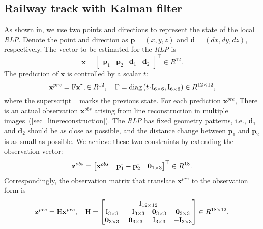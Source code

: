\subsection{Railway track with Kalman filter}
As shown in, 
we use two points and directions to represent the state of the local \textit{RLP}.
Denote the point and direction as
$\mathbf p=\left(x,y,z\right)$ and $\mathbf d=\left(dx,dy,dz\right)$,
respectively.
The vector to be estimated for the \textit{RLP} is
\begin{equation}
\mathbf x = \begin{bmatrix}
    \mathbf p_1 & \mathbf p_2 & \mathbf d_1  & \mathbf d_2 
\end{bmatrix}^ \top \in R^{12}.
\end{equation}
The prediction of $\mathbf x$ is controlled by a scalar $t$:
\begin{equation}
        \mathbf{x}^{pre}= 
        \mathrm F \mathbf x^{{\mbox -}}, \in R^{12}, \quad  
        \mathrm F=\operatorname{diag}\left(t \! \cdot \! \mathrm I_{6\times6} , \mathrm I_{6\times6}\right) \in R^{12\times 12},
        \label {eq_statetransition}
\end{equation}
where the superscript $^{\mbox -}$ marks the previous state.
For each prediction $\mathbf{x}^{pre}$,
There is an actual observation $\mathbf{x}^{obs}$ arising from line reconstruction in multiple images~(\cref*{sec_linereconstruction}).
The \textit{RLP} has fixed geometry patterns,
i.e.,
$\mathbf d_1$ and $\mathbf d_2$ should be as close as possible,
and the distance change between $\mathbf p_1$ and $\mathbf p_2$ is as small as possible.
We achieve these two constraints by extending the observation vector:
\begin{equation}
\mathbf{z}^{obs} = \begin{bmatrix}
    \mathbf{x}^{obs} & \mathbf p_1^{\mbox -} - \mathbf p_{2}^{\mbox -} & \mathbf 0_{1\times3}
\end{bmatrix}^ \top \in R^{18}.
\label {eq_observationvector}
\end{equation}
Correspondingly,
the observation matrix that translate $\mathbf{x}^{pre}$ to the observation form is
\begin{equation}
        \mathbf{z}^{pre}= 
        \mathrm H \mathbf x^{pre}, \quad  
        \mathrm H=
        \begin{bmatrix}
            \multicolumn{4}{c}{\mathrm{I}_{12 \times 12}} \\
            \mathrm{I}_{3 \times 3} & -\mathrm{I}_{3 \times 3} & \mathbf{0}_{3 \times 3} & \mathbf{0}_{3 \times 3} \\
            \mathbf{0}_{3 \times 3} & \mathbf{0}_{3 \times 3} & \mathrm{I}_{3 \times 3} & -\mathrm{I}_{3 \times 3}
        \end{bmatrix} \in R^{18 \times 12}.
        \label {eq_observationmatrix }
\end{equation}
